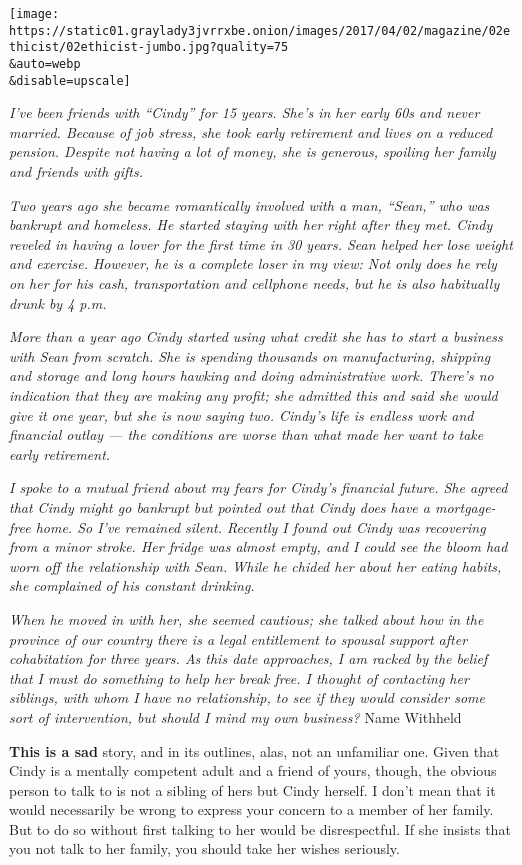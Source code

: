 \texttt{[image: https://static01.graylady3jvrrxbe.onion/images/2017/04/02/magazine/02ethicist/02ethicist-jumbo.jpg?quality=75\\\&auto=webp\\\&disable=upscale]}

\emph{I've been friends with ``Cindy'' for 15 years. She's in her early
60s and never married. Because of job stress, she took early retirement
and lives on a reduced pension. Despite not having a lot of money, she
is generous, spoiling her family and friends with gifts.}

\emph{Two years ago she became romantically involved with a man,
``Sean,'' who was bankrupt and homeless. He started staying with her
right after they met. Cindy reveled in having a lover for the first time
in 30 years. Sean helped her lose weight and exercise. However, he is a
complete loser in my view: Not only does he rely on her for his cash,
transportation and cellphone needs, but he is also habitually drunk by 4
p.m.}

\emph{More than a year ago Cindy started using what credit she has to
start a business with Sean from scratch. She is spending thousands on
manufacturing, shipping and storage and long hours hawking and doing
administrative work. There's no indication that they are making any
profit; she admitted this and said she would give it one year, but she
is now saying two. Cindy's life is endless work and financial outlay ---
the conditions are worse than what made her want to take early
retirement.}

\emph{I spoke to a mutual friend about my fears for Cindy's financial
future. She agreed that Cindy might go bankrupt but pointed out that
Cindy does have a mortgage-free home. So I've remained silent. Recently
I found out Cindy was recovering from a minor stroke. Her fridge was
almost empty, and I could see the bloom had worn off the relationship
with Sean. While he chided her about her eating habits, she complained
of his constant drinking.}

\emph{When he moved in with her, she seemed cautious; she talked about
how in the province of our country there is a legal entitlement to
spousal support after cohabitation for three years. As this date
approaches, I am racked by the belief that I must do something to help
her break free. I thought of contacting her siblings, with whom I have
no relationship, to see if they would consider some sort of
intervention, but should I mind my own business?} Name Withheld

\textbf{This is a sad} story, and in its outlines, alas, not an
unfamiliar one. Given that Cindy is a mentally competent adult and a
friend of yours, though, the obvious person to talk to is not a sibling
of hers but Cindy herself. I don't mean that it would necessarily be
wrong to express your concern to a member of her family. But to do so
without first talking to her would be disrespectful. If she insists that
you not talk to her family, you should take her wishes seriously.

